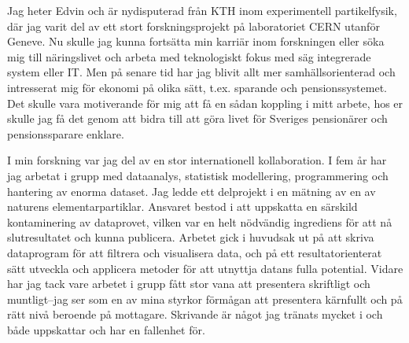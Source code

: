 \documentclass[11pt, a4paper]{../awesome-cv} %
\begin{document}
\makecvheader %

\makelettertitle %


\begin{cvletter}
\vspace{.6cm}

Jag heter Edvin och är nydisputerad från KTH inom experimentell partikelfysik, där jag varit del av ett stort forskningsprojekt på laboratoriet CERN utanför Geneve.
Nu skulle jag kunna fortsätta min karriär inom forskningen eller söka mig till näringslivet och arbeta med teknologiskt fokus med säg integrerade system eller IT. %
Men på senare tid har jag blivit allt mer samhällsorienterad och intresserat mig för ekonomi på olika sätt, t.ex. sparande och pensionssystemet. %
Det skulle vara motiverande för mig att få en sådan koppling i mitt arbete, hos er skulle jag få det genom att bidra till att göra livet för Sveriges pensionärer och pensionssparare enklare.

I min forskning var jag del av en stor internationell kollaboration. 
I fem år har jag arbetat i grupp med dataanalys, statistisk modellering, programmering och hantering av enorma dataset.
Jag ledde ett delprojekt i en mätning av en av naturens elementarpartiklar.
Ansvaret bestod i att uppskatta en särskild kontaminering av dataprovet, vilken var en helt nödvändig ingrediens för att nå slutresultatet och kunna publicera.
Arbetet gick i huvudsak ut på att skriva dataprogram för att filtrera och visualisera data, och på ett resultatorienterat sätt utveckla och applicera metoder för att utnyttja datans fulla potential.
Vidare har jag tack vare arbetet i grupp fått stor vana att presentera skriftligt och muntligt–jag ser som en av mina styrkor förmågan att presentera kärnfullt och på rätt nivå beroende på mottagare. %
 Skrivande är något jag tränats mycket i och både uppskattar och har en fallenhet för. 


\end{cvletter}
\end{document}
